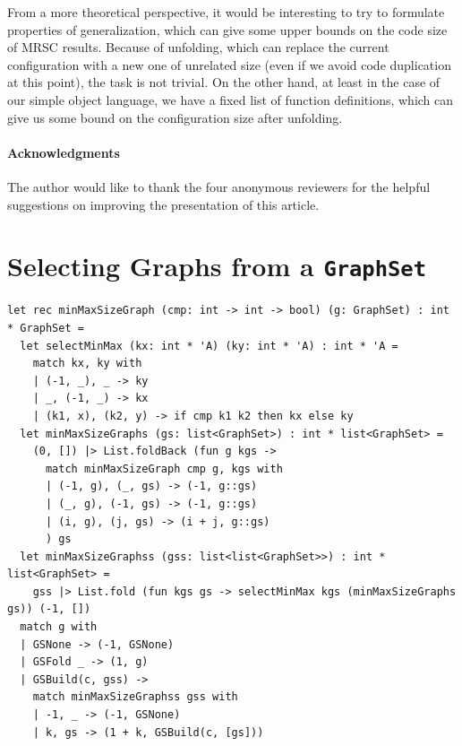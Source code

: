 \documentclass[submission,copyright,creativecommons]{eptcs}
\newif\ifVptVer
\begin{document}
From a more theoretical perspective, it would be interesting to try to formulate properties
of generalization, which can give some upper bounds on the code size of MRSC results.
Because of unfolding, which can replace the current configuration with a new one of unrelated size (even
if we avoid code duplication at this point), the task is not trivial.
On the other hand, at least in the case of our simple object language, we have a fixed
list of function definitions, which can give us some bound on the configuration size
after unfolding.

\paragraph{Acknowledgments}
The author would like to thank the four anonymous reviewers for
the helpful suggestions on improving the presentation of
this article.





\ifVptVer
\else

\appendix

\clearpage
\section{Selecting Graphs from a \texttt{GraphSet}}\label{app:FilterGraphSet}

\begin{lstlisting}[caption={Selecting a Graph of Minimum/Maximum Size from a Graph Set}]
let rec minMaxSizeGraph (cmp: int -> int -> bool) (g: GraphSet) : int * GraphSet =
  let selectMinMax (kx: int * 'A) (ky: int * 'A) : int * 'A =
    match kx, ky with
    | (-1, _), _ -> ky
    | _, (-1, _) -> kx
    | (k1, x), (k2, y) -> if cmp k1 k2 then kx else ky
  let minMaxSizeGraphs (gs: list<GraphSet>) : int * list<GraphSet> =
    (0, []) |> List.foldBack (fun g kgs -> 
      match minMaxSizeGraph cmp g, kgs with
      | (-1, g), (_, gs) -> (-1, g::gs)
      | (_, g), (-1, gs) -> (-1, g::gs)
      | (i, g), (j, gs) -> (i + j, g::gs)
      ) gs
  let minMaxSizeGraphss (gss: list<list<GraphSet>>) : int * list<GraphSet> =
    gss |> List.fold (fun kgs gs -> selectMinMax kgs (minMaxSizeGraphs gs)) (-1, [])
  match g with
  | GSNone -> (-1, GSNone)
  | GSFold _ -> (1, g)
  | GSBuild(c, gss) -> 
    match minMaxSizeGraphss gss with
    | -1, _ -> (-1, GSNone)
    | k, gs -> (1 + k, GSBuild(c, [gs]))
\end{lstlisting}
\end{document}
